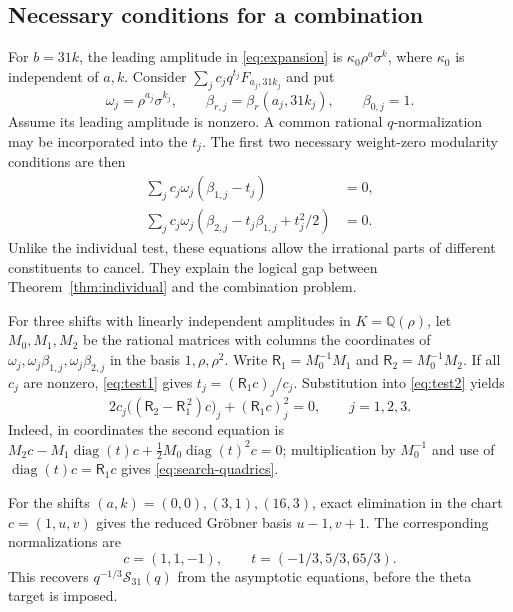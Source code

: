\documentclass[11pt,reqno]{amsart}
\newcommand{\QQ}{\mathbb Q}
\newcommand{\diag}{\operatorname{diag}}
\newcommand{\Ssum}{\mathcal S_{31}}
\theoremstyle{remark}
\numberwithin{equation}{section}
\begin{document}
\subsection{Necessary conditions for a combination}
For $b=31k$, the leading amplitude in \eqref{eq:expansion} is
$\kappa_0\rho^a\sigma^k$, where $\kappa_0$ is independent of $a,k$.
Consider $\sum_jc_jq^{t_j}F_{a_j,31k_j}$ and put
\[
 \omega_j=\rho^{a_j}\sigma^{k_j},\qquad
 \beta_{r,j}=\beta_r(a_j,31k_j),\qquad \beta_{0,j}=1.
\]
Assume its leading amplitude is nonzero. A common rational
$q$-normalization may be incorporated into the $t_j$. The first two
necessary weight-zero modularity conditions are then
\begin{align}
 \sum_jc_j\omega_j(\beta_{1,j}-t_j)&=0,\label{eq:test1}\\
 \sum_jc_j\omega_j(\beta_{2,j}-t_j\beta_{1,j}+t_j^2/2)&=0.
 \label{eq:test2}
\end{align}
Unlike the individual test, these equations allow the irrational parts
of different constituents to cancel. They explain the logical gap
between Theorem~\ref{thm:individual} and the combination problem.

For three shifts with linearly independent amplitudes in
$K=\QQ(\rho)$, let $M_0,M_1,M_2$ be the rational matrices with columns
the coordinates of $\omega_j,\omega_j\beta_{1,j},\omega_j\beta_{2,j}$ in the basis
$1,\rho,\rho^2$. Write $\mathsf R_1=M_0^{-1}M_1$ and $\mathsf R_2=M_0^{-1}M_2$.
If all $c_j$ are nonzero, \eqref{eq:test1} gives
$t_j=(\mathsf R_1c)_j/c_j$. Substitution into \eqref{eq:test2} yields
\begin{equation}\label{eq:search-quadrics}
 2c_j\bigl((\mathsf R_2-\mathsf R_1^{\,2})c\bigr)_j
       +(\mathsf R_1c)_j^2=0,\qquad j=1,2,3.
\end{equation}
Indeed, in coordinates the second equation is
$M_2c-M_1\diag(t)c+\tfrac12M_0\diag(t)^2c=0$; multiplication by
$M_0^{-1}$ and use of $\diag(t)c=\mathsf R_1c$ gives
\eqref{eq:search-quadrics}.

For the shifts $(a,k)=(0,0),(3,1),(16,3)$, exact elimination in the
chart $c=(1,u,v)$ gives the reduced Gr\"obner basis $u-1,v+1$.
The corresponding normalizations are
\begin{equation}\label{eq:search-solution}
 c=(1,1,-1),\qquad t=(-1/3,5/3,65/3).
\end{equation}
This recovers $q^{-1/3}\Ssum(q)$ from the asymptotic equations, before
the theta target is imposed.
\end{document}
